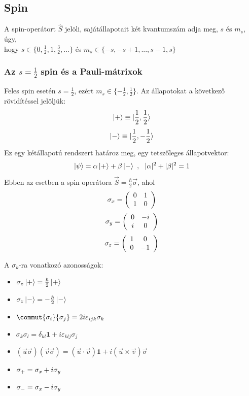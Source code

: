 \subsection{Spin}
A spin-operátort $\hat S$ jelöli, sajátállapotait két kvantumszám adja meg, $s$ és $m_s$, úgy, \\ hogy
$s\in\{0, \frac{1}{2}, 1, \frac{3}{2}, ...\}$ és $m_s \in \{-s, -s+1,...,s-1, s\}$

\subsubsection{Az $s = \frac{1}{2}$ spin és a Pauli-mátrixok}
Feles spin esetén $s=\frac{1}{2}$, ezért $m_s \in \{-\frac{1}{2},\frac{1}{2}\}$. Az állapotokat a következő rövidítéssel jelöljük:
\begin{equation}
    \ket + \equiv \ket{\frac{1}{2}, \frac{1}{2}}    
\end{equation}
\begin{equation}
    \ket - \equiv \ket{\frac{1}{2}, -\frac{1}{2}}    
\end{equation}
Ez egy kétállapotú rendszert határoz meg, egy tetszőleges állapotvektor:
\begin{equation}
    \ket\psi = \alpha\ket+ + \beta\ket- ~,~~ |\alpha|^2 + |\beta|^2 = 1    
\end{equation}
Ebben az esetben a spin operátora $\vec S = \frac{\hbar}{2}\vec{\sigma}$, ahol
\begin{equation} \sigma_x = \left( \begin{array}{cc} 0 & 1 \\ 1 & 0 \end{array} \right) \end{equation}
\begin{equation} \sigma_y = \left( \begin{array}{cc} 0 & -i \\ i & 0 \end{array} \right) \end{equation}
\begin{equation} \sigma_z = \left( \begin{array}{cc} 1 & 0 \\ 0 & -1 \end{array} \right) \end{equation}

A $\sigma_k$-ra vonatkozó azonosságok:
\begin{itemize}
    \item $\sigma_z \ket+ = \frac{\hbar}{2}\ket+$
    \item $\sigma_z \ket- = -\frac{\hbar}{2}\ket-$    
    \item $
        \commut{\sigma_i}{\sigma_j} = 2i\varepsilon_{ijk}\sigma_k
    $
    \item $
        \sigma_k\sigma_l = \delta_{kl}\mathbf 1 + i\varepsilon_{klj}\sigma_j
    $
    \item $
        (\vec u \vec \sigma)(\vec v\vec\sigma) = (\vec u\cdot\vec v)\mathbf 1 + i(\vec u \times\vec v)\vec\sigma
    $
    \item $
        \sigma_+ = \sigma_x + i\sigma_y
    $
    \item $
        \sigma_- = \sigma_x - i\sigma_y
    $

\end{itemize}
